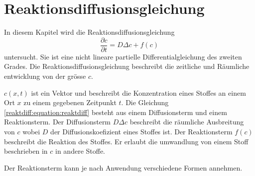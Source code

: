 %
%
%
%
\chapter{Reaktionsdiffusionsgleichung\label{chapter:reaktdiff}}
\begin{refsection}

In diesem Kapitel wird die Reaktionsdiffusionsgleichung
\begin{equation}
\label{reaktdiff:equation:reaktdiff}
\frac{\partial c}{\partial t} = D \Delta c + f(c)
\end{equation}
untersucht.
Sie ist eine nicht lineare partielle Differentialgleichung des zweiten Grades.
Die Reaktionsdiffusionsgleichung beschreibt die zeitliche und Räumliche entwicklung von der grösse \(c\).

\(c(x,t)\) ist ein Vektor und beschreibt die Konzentration eines Stoffes an einem Ort \(x\) zu einem gegebenen Zeitpunkt \(t\).
Die Gleichung \ref{reaktdiff:equation:reaktdiff} besteht aus einem Diffusionsterm und einem Reaktionsterm.
Der Diffusionsterm \(D \Delta c\) beschreibt die räumliche Ausbreitung von \(c\) wobei \(D\) der Diffusionskoefizient eines Stoffes ist.
Der Reaktionsterm \(f(c)\) beschreibt die Reaktion des Stoffes.
Er erlaubt die umwandlung von einem Stoff beschrieben in \(c\) in andere Stoffe.

Der Reaktionsterm kann je nach Anwendung verschiedene Formen annehmen.





\printbibliography[heading=subbibliography]
\end{refsection}
